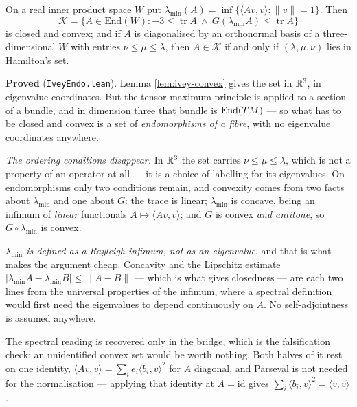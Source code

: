 \begin{lemma}
  \label{lem:ivey-endo}
  \leanok
  On a real inner product space $W$ put $\lambda_{\min}(A) = \inf\{\langle Av,v\rangle :
  \|v\| = 1\}$. Then
  \[
    \mathcal{K} = \{A \in \mathrm{End}(W) : -3 \le \operatorname{tr} A
      \ \wedge\ G(\lambda_{\min} A) \le \operatorname{tr} A\}
  \]
  is closed and convex; and if $A$ is diagonalised by an orthonormal basis of a
  three-dimensional $W$ with entries $\nu \le \mu \le \lambda$, then $A \in \mathcal{K}$ if
  and only if $(\lambda,\mu,\nu)$ lies in Hamilton's set.

  \textbf{Proved} (\texttt{IveyEndo.lean}). Lemma \ref{lem:ivey-convex} gives the set in
  $\mathbb{R}^3$, in eigenvalue coordinates. But the tensor maximum principle is applied to a section
  of a bundle, and in dimension three that bundle is $\mathrm{End}(TM)$ --- so what has to
  be closed and convex is a set of \emph{endomorphisms of a fibre}, with no eigenvalue
  coordinates anywhere.

  \emph{The ordering conditions disappear.} In $\mathbb{R}^3$ the set carries $\nu \le \mu \le
  \lambda$, which is not a property of an operator at all --- it is a choice of labelling for
  its eigenvalues. On endomorphisms only two conditions remain, and convexity comes from two
  facts about $\lambda_{\min}$ and one about $G$: the trace is linear; $\lambda_{\min}$ is
  concave, being an infimum of \emph{linear} functionals $A \mapsto \langle Av,v\rangle$; and
  $G$ is convex \emph{and antitone}, so $G \circ \lambda_{\min}$ is convex.

  \emph{$\lambda_{\min}$ is defined as a Rayleigh infimum, not as an eigenvalue}, and that is
  what makes the argument cheap. Concavity and the Lipschitz estimate $|\lambda_{\min} A -
  \lambda_{\min} B| \le \|A - B\|$ --- which is what gives closedness --- are each two lines
  from the universal properties of the infimum, where a spectral definition would first need
  the eigenvalues to depend continuously on $A$. No self-adjointness is assumed anywhere.

  The spectral reading is recovered only in the bridge, which is the falsification check: an
  unidentified convex set would be worth nothing. Both halves of it rest on one identity,
  $\langle Av,v\rangle = \sum_i e_i \langle b_i,v\rangle^2$ for $A$ diagonal, and Parseval is
  not needed for the normalisation --- applying that identity at $A = \mathrm{id}$ gives
  $\sum_i \langle b_i,v\rangle^2 = \langle v,v\rangle$.
\end{lemma}

